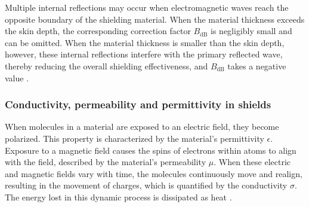 Multiple internal reflections may occur when electromagnetic waves reach the 
opposite boundary of the shielding material. When the material thickness 
exceeds the skin depth, the corresponding correction factor $B_{\mathrm{dB}}$ 
is negligibly small and can be omitted. When the material thickness is smaller 
than the skin depth, however, these internal reflections interfere with the 
primary reflected wave, thereby reducing the overall shielding effectiveness, 
and $B_{\mathrm{dB}}$ takes a negative value \cite[p.~1]{Jaroszewski_Thomas_Rane_2019}.


\subsubsection{Conductivity, permeability and permittivity in shields}\label{sec:shielding_parameters}




%


When molecules in a material are exposed to an electric field, they become polarized. This property is characterized by the material's permittivity $\epsilon$. Exposure to a magnetic field causes the spins of electrons within atoms to align with the field, described by the material’s permeability $\mu$. When these electric and magnetic fields vary with time, the molecules continuously move and realign, resulting in the movement of charges, which is quantified by the conductivity $\sigma$. The energy lost in this dynamic process is dissipated as heat \cite[p.~68]{Balanis_2012}.

